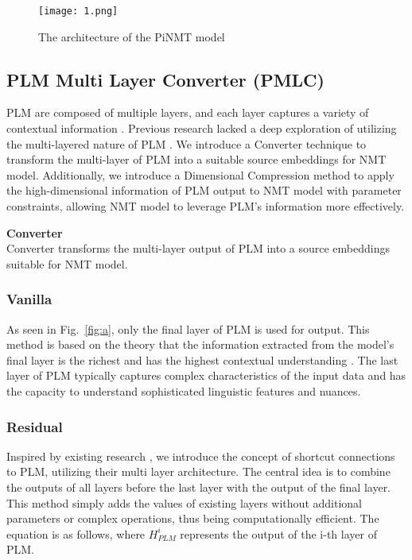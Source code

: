 \documentclass[conference]{IEEEtran}
\begin{document}
\begin{figure*}[tb]
  \centering
  \texttt{[image: 1.png]}
  \caption{The architecture of the PiNMT model}
  \label{fig:1.png}
\end{figure*}



\subsection{PLM Multi Layer Converter (PMLC)}
PLM are composed of multiple layers, and each layer captures a variety of contextual information \cite{peters2018elmo, jawahar2019does}. Previous research lacked a deep exploration of utilizing the multi-layered nature of PLM \cite{edunov2019pretrained, xu2021bibert}. We introduce a Converter technique to transform the multi-layer of PLM into a suitable source embeddings for NMT model. Additionally, we introduce a Dimensional Compression method to apply the high-dimensional information of PLM output to NMT model with parameter constraints, allowing NMT model to leverage PLM's information more effectively.


\noindent \textbf{Converter}\\
Converter transforms the multi-layer output of PLM into a source embeddings suitable for NMT model.

\subsubsection{Vanilla} 
As seen in Fig.~\ref{fig:a}, only the final layer of PLM is used for output. This method is based on the theory that the information extracted from the model's final layer is the richest and has the highest contextual understanding \cite{Sun2019}. The last layer of PLM typically captures complex characteristics of the input data and has the capacity to understand sophisticated linguistic features and nuances.


\subsubsection{Residual} 
Inspired by existing research \cite{He2015}, we introduce the concept of shortcut connections to PLM, utilizing their multi layer architecture. The central idea is to combine the outputs of all layers before the last layer with the output of the final layer. This method simply adds the values of existing layers without additional parameters or complex operations, thus being computationally efficient. The equation is as follows, where $H_{PLM}^i$ represents the output of the i-th layer of PLM.
\end{document}
